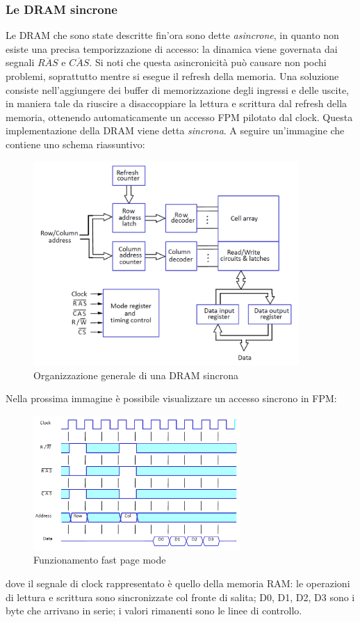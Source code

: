 \documentclass[class=book, crop=false, oneside]{standalone}
\begin{document}
\subsubsection{Le DRAM sincrone}
Le DRAM che sono state descritte fin'ora sono dette \emph{asincrone}, in quanto non esiste una precisa temporizzazione di accesso: la dinamica viene governata dai segnali \emph{\(\overline{RAS}\)} e \emph{\(\overline{CAS}\)}. Si noti che questa asincronicità può causare non pochi problemi, soprattutto mentre si esegue il refresh della memoria. Una soluzione consiste nell'aggiungere dei buffer di memorizzazione degli ingressi e delle uscite, in maniera tale da riuscire a disaccoppiare la lettura e scrittura dal refresh della memoria, ottenendo automaticamente un accesso FPM pilotato dal clock. Questa implementazione della DRAM viene detta \emph{sincrona}. A seguire un'immagine che contiene uno schema riassuntivo:
\begin{figure}[H]
	\centering
	\includegraphics[width=0.9\textwidth,keepaspectratio]{DRAM_sincrona.png}
	\caption{Organizzazione generale di una DRAM sincrona}
\end{figure}

Nella prossima immagine è possibile visualizzare un accesso sincrono in FPM:
\begin{figure}[H]
	\centering
	\includegraphics[width=0.7\textwidth,keepaspectratio]{FPM.png}
	\caption{Funzionamento fast page mode}
\end{figure}
dove il segnale di clock rappresentato è quello della memoria RAM: le operazioni di lettura e scrittura sono sincronizzate col fronte di salita; D0, D1, D2, D3 sono i byte che arrivano in serie; i valori rimanenti sono le linee di controllo.
\end{document}
